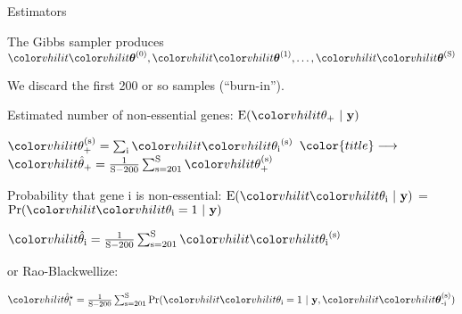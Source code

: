 \documentclass[aspectratio=169,12pt,t]{beamer}
\newcommand{\one}{\text{1}}
\newcommand{\boldy}{\text{\textbf{y}}}
\newcommand{\thetai}{{\vhilit \theta_\text{i}}}
\newcommand{\sumi}{\sum_\text{i}}
\newcommand{\boldtheta}{{\vhilit \boldsymbol{\theta}}}
\begin{document}
\begin{frame}{Estimators}


The Gibbs sampler produces ${\vhilit
\boldtheta^\text{(0)}},  {\vhilit
\boldtheta^\text{(1)}}, \dots, {\vhilit
\boldtheta^\text{(S)}}$

\smallskip

We discard the first 200 or so samples (``burn-in'').

\bigskip
\bigskip

{\color{title} Estimated number of non-essential genes}:
$\text{E}({\vhilit \theta_+}  \ | \ \boldy)$

\smallskip

\hspace{30mm} ${\vhilit \theta_+^\text{(s)}} = \sumi
{\vhilit \thetai^\text{(s)}}$ \hspace{15mm}
${\color{title} \longrightarrow}$ \hspace{15mm}
${\vhilit \hat{\theta}_+} = \textstyle{\frac{\one}{\text{S} -
\text{200}} \sum_{\text{s}=\text{201}}^\text{S} {\vhilit \theta_+^\text{(s)}}}$

\bigskip
\bigskip

{\color{title} Probability that gene i is non-essential}:
$\text{E}({\vhilit \thetai} \ | \ \boldy)$ =
$\text{Pr}({\vhilit \thetai} = \one \ | \ \boldy)$

\smallskip

\hspace{30mm} ${\vhilit \hat{\theta}_\text{i}} =
\textstyle{\frac{\one}{\text{S} - \text{200}} \sum_{\text{s} =
\text{201}}^\text{S} {\vhilit \thetai^\text{(s)}}}$


\bigskip
\bigskip

\hspace{10mm} {\color{title} or Rao-Blackwellize:}

\smallskip

\hspace{30mm} ${\vhilit \hat{\theta}_\text{i}^\star} =
\textstyle{\frac{\one}{\text{S} - \text{200}} \sum_{\text{s} =
\text{201}}^\text{S} \text{Pr}({\vhilit \thetai} =
\one \ | \ \boldy, {\vhilit \boldtheta_\text{-i}^\text{(s)}})}$



\end{frame}
\end{document}
